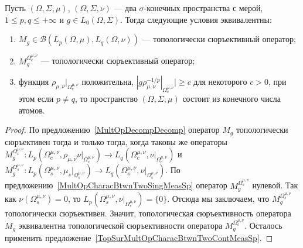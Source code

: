 \begin{proposition}\label{TopSurMultOpCharacBtwnTwoMeasSp} Пусть
$(\Omega,\Sigma,\mu)$, $(\Omega,\Sigma,\nu)$ --- два $\sigma$-конечных
пространства с мерой, $1\leq p,q\leq +\infty$ и $g\in L_0(\Omega,\Sigma)$. Тогда
следующие условия эквивалентны:

\begin{enumerate}[label = (\roman*)]
    \item $M_g\in\mathcal{B}(L_p(\Omega,\mu), L_q(\Omega,\nu))$ --- 
    топологически сюръективный оператор;

    \item $M_g^{\Omega_c^{\mu,\nu}}$ --- топологически сюръективный оператор;

    \item функция $\rho_{\mu,\nu}|_{\Omega_c^{\mu,\nu}}$ положительна, $|g
    \rho_{\mu,\nu}^{-1/p}|_{\Omega_c^{\mu,\nu}}|\geq c$ для некоторого $c>0$, 
    при этом если $p\neq q$, то пространство $(\Omega,\Sigma,\mu)$ состоит 
    из конечного числа атомов.
\end{enumerate}
\end{proposition}
\begin{proof} По предложению~\ref{MultOpDecompDecomp} оператор $M_g$
топологически сюръективен тогда и только тогда, когда таковы же операторы
$M_g^{\Omega_c^{\mu,\nu}}:L_p(\Omega_c^{\mu,\nu},\rho_{\mu,\nu}
\nu|_{\Omega_c^{\mu,\nu}})\to L_q(\Omega_c^{\mu,\nu},\nu|_{\Omega_c^{\mu,\nu}})$
и
$M_g^{\Omega_s^{\mu,\nu}}
:L_p(\Omega_s^{\mu,\nu},\mu_s|_{\Omega_s^{\mu,\nu}})
    \to 
L_q(\Omega_s^{\mu,\nu},\nu|_{\Omega_s^{\mu,\nu}})$. По
предложению~\ref{MultOpCharacBtwnTwoSingMeasSp} оператор
$M_g^{\Omega_s^{\mu,\nu}}$ нулевой. Так как $\nu(\Omega_s^{\mu,\nu})=0$, то
$L_p(\Omega_s^{\mu,\nu},\nu|_{\Omega_s^{\mu,\nu}})= \{0 \}$. Отсюда мы
заключаем, что $M_g^{\Omega_s^{\mu,\nu}}$ топологически сюръективен. Значит,
топологическая сюръективность оператора $M_g$ эквивалентна топологической
сюръективности оператора $M_g^{\Omega_c^{\mu,\nu}}$. Осталось применить
предложение~\ref{TopSurMultOpCharacBtwnTwoContMeasSp}.
\end{proof}

